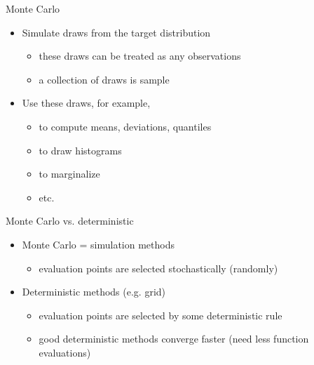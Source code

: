 \documentclass[english,t]{beamer}
\begin{document}

\begin{frame}{Monte Carlo}

  \begin{itemize}
  \item Simulate draws from the target distribution
    \begin{itemize}
    \item these draws can be treated as any observations
    \item a collection of draws is sample
    \end{itemize}
  \item Use these draws, for example,
    \begin{itemize}
    \item to compute means, deviations, quantiles
    \item to draw histograms
    \item to marginalize
    \item etc.
    \end{itemize}
  \end{itemize}

\end{frame}

\begin{frame}
{Monte Carlo vs. deterministic}

  \begin{itemize}
  \item Monte Carlo = simulation methods
    \begin{itemize}
    \item evaluation points are selected stochastically (randomly)
    \end{itemize}
  \item Deterministic methods (e.g. grid)
    \begin{itemize}
    \item evaluation points are selected by some deterministic rule
    \item good deterministic methods converge faster (need less function evaluations)
    \end{itemize}
  \end{itemize}

\end{frame}
\end{document}
